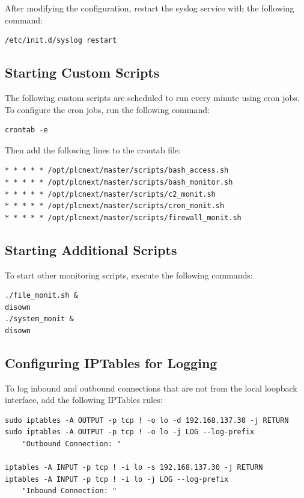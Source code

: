 \documentclass[Master,BMR,english]{twbook}
\begin{document}
After modifying the configuration, restart the syslog service with the following command:

\begin{verbatim}
/etc/init.d/syslog restart
\end{verbatim}

\subsection*{Starting Custom Scripts}

The following custom scripts are scheduled to run every minute using cron jobs. To configure the cron jobs, run the following command:

\begin{verbatim}
crontab -e
\end{verbatim}

Then add the following lines to the crontab file:

\begin{verbatim}
* * * * * /opt/plcnext/master/scripts/bash_access.sh  
* * * * * /opt/plcnext/master/scripts/bash_monitor.sh  
* * * * * /opt/plcnext/master/scripts/c2_monit.sh  
* * * * * /opt/plcnext/master/scripts/cron_monit.sh 
* * * * * /opt/plcnext/master/scripts/firewall_monit.sh
\end{verbatim}

\subsection*{Starting Additional Scripts}

To start other monitoring scripts, execute the following commands:

\begin{verbatim}
./file_monit.sh &
disown
./system_monit &
disown
\end{verbatim}

\subsection*{Configuring IPTables for Logging}

To log inbound and outbound connections that are not from the local loopback interface, add the following IPTables rules:

\begin{verbatim}
sudo iptables -A OUTPUT -p tcp ! -o lo -d 192.168.137.30 -j RETURN
sudo iptables -A OUTPUT -p tcp ! -o lo -j LOG --log-prefix 
    "Outbound Connection: "

iptables -A INPUT -p tcp ! -i lo -s 192.168.137.30 -j RETURN
iptables -A INPUT -p tcp ! -i lo -j LOG --log-prefix 
    "Inbound Connection: "
\end{verbatim}
\end{document}
